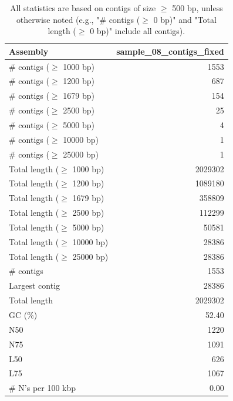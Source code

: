 \documentclass[12pt,a4paper]{article}
\begin{document}
\begin{table}[ht]
\begin{center}
\caption{All statistics are based on contigs of size $\geq$ 500 bp, unless otherwise noted (e.g., "\# contigs ($\geq$ 0 bp)" and "Total length ($\geq$ 0 bp)" include all contigs).}
\begin{tabular}{|l*{1}{|r}|}
\hline
Assembly & sample\_08\_contigs\_fixed \\ \hline
\# contigs ($\geq$ 1000 bp) & 1553 \\ \hline
\# contigs ($\geq$ 1200 bp) & 687 \\ \hline
\# contigs ($\geq$ 1679 bp) & 154 \\ \hline
\# contigs ($\geq$ 2500 bp) & 25 \\ \hline
\# contigs ($\geq$ 5000 bp) & 4 \\ \hline
\# contigs ($\geq$ 10000 bp) & 1 \\ \hline
\# contigs ($\geq$ 25000 bp) & 1 \\ \hline
Total length ($\geq$ 1000 bp) & 2029302 \\ \hline
Total length ($\geq$ 1200 bp) & 1089180 \\ \hline
Total length ($\geq$ 1679 bp) & 358809 \\ \hline
Total length ($\geq$ 2500 bp) & 112299 \\ \hline
Total length ($\geq$ 5000 bp) & 50581 \\ \hline
Total length ($\geq$ 10000 bp) & 28386 \\ \hline
Total length ($\geq$ 25000 bp) & 28386 \\ \hline
\# contigs & 1553 \\ \hline
Largest contig & 28386 \\ \hline
Total length & 2029302 \\ \hline
GC (\%) & 52.40 \\ \hline
N50 & 1220 \\ \hline
N75 & 1091 \\ \hline
L50 & 626 \\ \hline
L75 & 1067 \\ \hline
\# N's per 100 kbp & 0.00 \\ \hline
\end{tabular}
\end{center}
\end{table}
\end{document}
